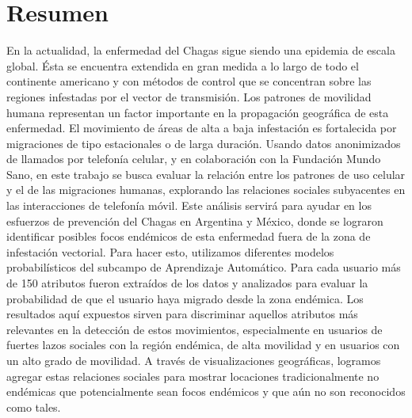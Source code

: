 \chapter{Resumen}
\label{cha:resumen}

En la actualidad, la enfermedad del Chagas sigue siendo una epidemia de escala global.
Ésta se encuentra extendida en gran medida a lo largo de todo el continente americano y con métodos de control que se concentran sobre las regiones infestadas por el vector de transmisión.
Los patrones de movilidad humana representan un factor importante en la propagación geográfica de esta enfermedad.
El movimiento de áreas de alta a baja infestación es fortalecida por migraciones de tipo estacionales o de larga duración.
Usando datos anonimizados de llamados por telefonía celular, y en colaboración con la Fundación Mundo Sano, en este trabajo se busca evaluar la relación entre los patrones de uso celular y el de las migraciones humanas, explorando las relaciones sociales subyacentes en las interacciones de telefonía móvil.
Este análisis servirá para ayudar en los esfuerzos de prevención del Chagas en Argentina y México, donde se lograron identificar posibles focos endémicos de esta enfermedad fuera de la zona de infestación vectorial.
Para hacer esto, utilizamos diferentes modelos probabilísticos del subcampo de Aprendizaje Automático.
Para cada usuario más de 150 atributos fueron extraídos de los datos y analizados para evaluar la probabilidad de que el usuario haya migrado desde la zona endémica.
Los resultados aquí expuestos sirven para discriminar aquellos atributos más relevantes en la detección de estos movimientos, especialmente en usuarios de fuertes lazos sociales con la región endémica, de alta movilidad y en usuarios con un alto grado de movilidad.
A través de visualizaciones geográficas, logramos agregar estas relaciones sociales para mostrar locaciones tradicionalmente no endémicas que potencialmente sean focos endémicos y que aún no son reconocidos como tales.


